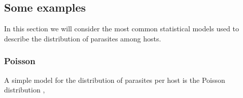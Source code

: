 \documentclass[12pt,a4paper]{article}
\theoremstyle{plain}%
\theoremstyle{definition}
\theoremstyle{remark}
\begin{document}
	
%	
	
	
	\subsection{Some examples}\label{sec:ejemplos}
	In this section we will consider the most common statistical models used to describe the distribution of parasites among hosts.
	\subsubsection{Poisson}
	A simple model for the distribution of parasites per host  is the Poisson distribution \cite{lahmar2001frequency},
	
\end{document}
